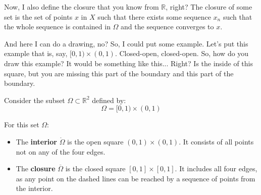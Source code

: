 \begin{spoken-clean}[00:01:31 - 00:03:40]
Now, I also define the closure that you know from $\mathbb{R}$, right? The closure of some set is the set of points $x$ in $X$ such that there exists some sequence $x_n$ such that the whole sequence is contained in $\Omega$ and the sequence converges to $x$. 

And here I can do a drawing, no? So, I could put some example. Let's put this example that is, say, $[0, 1) \times (0, 1)$. Closed-open, closed-open. So, how do you draw this example? It would be something like this...  Right? Is the inside of this square, but you are missing this part of the boundary and this part of the boundary.
\end{spoken-clean}

\begin{math-stroke}
Consider the subset $\Omega \subset \mathbb{R}^2$ defined by:
\[ \Omega = [0, 1) \times (0, 1) \]
\begin{center}
\end{center}

\begin{explanation-of-steps}
For this set $\Omega$:
\begin{itemize}
    \item The \textbf{interior} $\mathring{\Omega}$ is the open square $(0, 1) \times (0, 1)$. It consists of all points not on any of the four edges.
    \item The \textbf{closure} $\overline{\Omega}$ is the closed square $[0, 1] \times [0, 1]$. It includes all four edges, as any point on the dashed lines can be reached by a sequence of points from the interior.
\end{itemize}
\end{explanation-of-steps}
\end{math-stroke}

